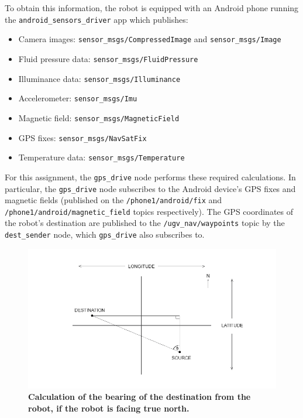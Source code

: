 \documentclass[titlepage,12pt,a4paper]{article}
\begin{document}
To obtain this information, the robot is equipped with an Android phone running the \verb|android_sensors_driver| app which publishes:

\begin{itemize}
	\item Camera images: \verb|sensor_msgs/CompressedImage| and \verb|sensor_msgs/Image|
	\item Fluid pressure data: \verb|sensor_msgs/FluidPressure|
	\item Illuminance data: \verb|sensor_msgs/Illuminance|
	\item Accelerometer: \verb|sensor_msgs/Imu|
	\item Magnetic field: \verb|sensor_msgs/MagneticField|
	\item GPS fixes: \verb|sensor_msgs/NavSatFix|
	\item Temperature data: \verb|sensor_msgs/Temperature| \\
\end{itemize}

For this assignment, the \verb|gps_drive| node performs these required calculations. In particular, the \verb|gps_drive| node subscribes to the Android device's GPS fixes and magnetic fields (published on the \verb|/phone1/android/fix| and \verb|/phone1/android/magnetic_field| topics respectively). The GPS coordinates of the robot's destination are published to the  \verb|/ugv_nav/waypoints| topic by the \verb|dest_sender| node, which \verb|gps_drive| also subscribes to.

\pagebreak

\begin{figure}[h]
	\centering
	\includegraphics[scale=0.6]{figures/bearings.png}
	\caption{\textbf{Calculation of the bearing of the destination from the robot, if the robot is facing true north.}}
\end{figure}
\end{document}
